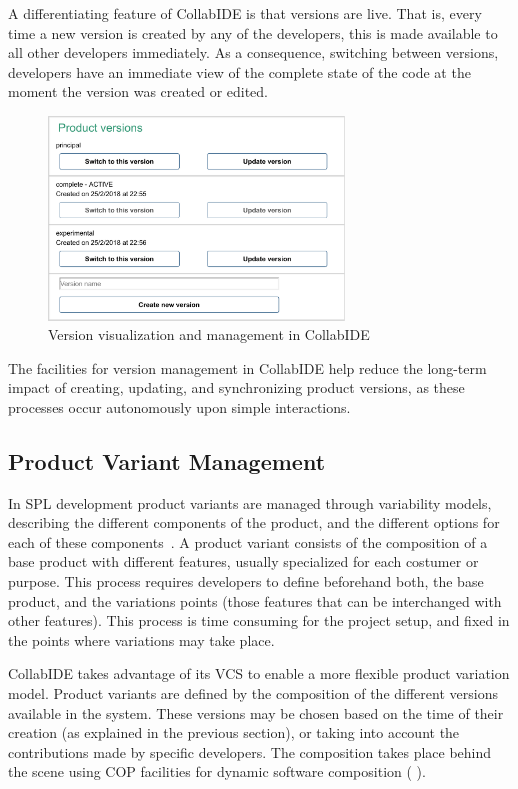 A differentiating feature of CollabIDE is that versions are live. That is, every time a new version is 
created by any of the developers, this is made available to all other developers immediately. 
As a consequence, switching between versions, developers have an immediate view of the complete 
state of the code at the moment the version was created or edited. 

\begin{figure}[tbp]
  \centering
  \includegraphics[width=0.7\textwidth]{img/fig4-collabIDEVersionManagement}
  \caption{Version visualization and management in CollabIDE}
  \label{fig:versions}
\end{figure}

The facilities for version management in CollabIDE help reduce the long-term impact of creating, 
updating, and synchronizing product versions, as these processes occur autonomously upon simple 
interactions.

\subsection{Product Variant Management}
\label{sec:product-variant}
In \ac{SPL} development product variants are managed through variability models, describing the 
different components of the product, and the different options for each of these 
components~\cite{pohl05}. A product variant consists of the composition of a base product with 
different features, usually specialized for each costumer or purpose. This process requires developers 
to define beforehand both, the base product, and the variations points (\ie those features that can be 
interchanged with other features). This process is time consuming for the project setup, and fixed in 
the points where variations may take place.

CollabIDE takes advantage of its \ac{VCS} to enable a more flexible product variation model. Product 
variants are defined by the composition of the different versions available in the system. These 
versions may be chosen based on the time of their creation (as explained in the previous section), or 
taking into account the contributions made by specific developers. The composition takes place 
behind the scene using \ac{COP} facilities for dynamic software composition (\cf 
{}).

